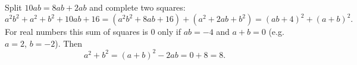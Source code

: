 Split $10ab=8ab+2ab$ and complete two squares:
\[
a^2b^2+a^2+b^2+10ab+16=(a^2b^2+8ab+16)+(a^2+2ab+b^2)=(ab+4)^2+(a+b)^2 .
\]
For real numbers this sum of squares is $0$ only if $ab=-4$ and $a+b=0$ (e.g.\ $a=2$, $b=-2$). Then
\[
a^2+b^2=(a+b)^2-2ab=0+8=\boxed{8}.
\]
